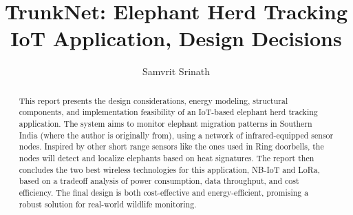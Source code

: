 \documentclass[sigconf,letterpaper,10pt,nonacm]{acmart}
\begin{document}
\title{TrunkNet: Elephant Herd Tracking IoT Application, Design Decisions}
\author{Samvrit Srinath}

\begin{abstract}
    This report presents the design considerations, energy modeling, structural components, and implementation feasibility of an IoT-based elephant herd tracking application. The system aims to monitor elephant migration patterns in Southern India (where the author is originally from), using a network of infrared-equipped sensor nodes. Inspired by other short range sensors like the ones used in Ring doorbells, the nodes will detect and localize elephants based on heat signatures. The report then concludes the two best wireless technologies for this application, NB-IoT and LoRa, based on a tradeoff analysis of power consumption, data throughput, and cost efficiency. The final design is both cost-effective and energy-efficient, promising a robust solution for real-world wildlife monitoring.
\end{abstract}

\maketitle





% 









\end{document}
